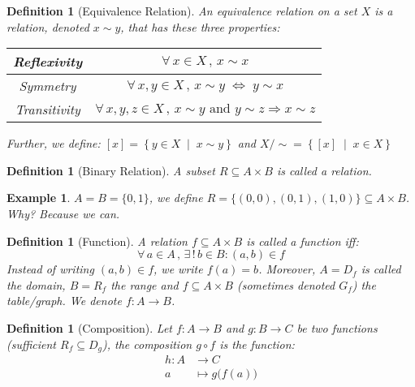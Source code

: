 \documentclass[12pt]{article}
\let\RA\Rightarrow
\let\LR\Leftrightarrow
\newcommand{\set}[2]{\left\{{#1}\;\middle|\;{#2}\right\}}
\newcommand{\Forall}[1]{\forall\,{#1}\,,\,}
\newcommand{\Exist}[1]{\exists\,{#1}:}
\newcommand*{\B}{\{0,1\}}
\newtheorem{definition}[theorem]{Definition}
\newtheorem{example}[theorem]{Example}
\begin{document}
\begin{definition}[Equivalence Relation]
  \label{equiv_rel}
  An equivalence relation on a set $X$ is a relation, denoted $x \sim y$, that has these three properties:
  \begin{table}[H]
    \centering
    \begin{tabular}{|c|c|}\hline
      Reflexivity & $\Forall{x \in X} x \sim x$\\\hline
      Symmetry & $\Forall{x,y \in X} x \sim y \;  \LR \; y \sim x$ \\\hline
      Transitivity & $\Forall{x,y,z \in X} x \sim y \text{ and } y \sim z \RA x \sim z$\\\hline
    \end{tabular}
  \end{table}
  Further, we define: $[x]=\set{y\in X}{x\sim y}$ and $X/\sim=\set{[x]}{x\in X}$
\end{definition}

\begin{definition}[Binary Relation]
  A subset $R\subseteq A\times B$ is called a relation.
\end{definition}

\begin{example}
  $A=B=\B$, we define $R=\{(0,0),(0,1),(1,0)\}\subseteq A\times B$. Why? Because we can.
\end{example}

\begin{definition}[Function]
  A relation $f\subseteq A\times B$ is called a function iff: $$\Forall{a\in A}\Exist{!\,b\in B}(a,b)\in f$$ Instead of writing $(a,b)\in f$, we write $f(a)=b$. Moreover, $A=D_f$ is called the domain, $B=R_f$ the range and $f\subseteq A\times B$ (sometimes denoted $G_f$) the table/graph. We denote $f:A\to B$.
\end{definition}

\begin{definition}[Composition]
  Let $f:A\to B$ and $g:B\to C$ be two functions (sufficient  $R_f\subseteq D_g$), the composition $g\circ f$ is the function:$$
  \begin{aligned}
    h: A&\to C\\
    a&\mapsto g\big(f(a)\big)
  \end{aligned}$$
\end{definition}
\end{document}
